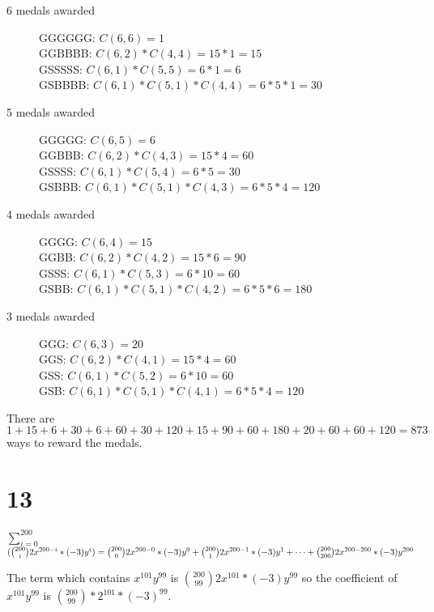 \documentclass[12pt]{article}
\begin{document}
\begin{description}
	\item[6 medals awarded]
	GGGGGG: $C(6, 6) = 1$\\
	GGBBBB: $C(6, 2) * C(4, 4) = 15 * 1 = 15$\\
	GSSSSS: $C(6, 1) * C(5, 5) = 6 * 1 = 6$\\
	GSBBBB: $C(6, 1) * C(5, 1) * C(4, 4) = 6 * 5 * 1 = 30$

	\item[5 medals awarded]
	GGGGG: $C(6, 5) = 6$\\
	GGBBB: $C(6, 2) * C(4, 3) = 15 * 4 = 60$\\
	GSSSS: $C(6, 1) * C(5, 4) = 6 * 5 = 30$\\
	GSBBB: $C(6, 1) * C(5, 1) * C(4, 3) = 6 * 5 * 4 = 120$

	\item[4 medals awarded]
	GGGG: $C(6, 4) = 15$\\
	GGBB: $C(6, 2) * C(4, 2) = 15 * 6 = 90$\\
	GSSS: $C(6, 1) * C(5, 3) = 6 * 10 = 60$\\
	GSBB: $C(6, 1) * C(5, 1) * C(4, 2) = 6 * 5 * 6 = 180$

	\item[3 medals awarded]
	GGG: $C(6, 3) = 20$\\
	GGS: $C(6, 2) * C(4, 1) = 15 * 4 = 60$\\
	GSS: $C(6, 1) * C(5, 2) = 6 * 10 = 60$\\
	GSB: $C(6, 1) * C(5, 1) * C(4, 1) = 6 * 5 * 4 = 120$
\end{description}

There are $1 + 15 + 6 + 30 + 6 + 60 + 30 + 120 + 15 + 90 + 60 + 180 + 20 + 60 + 60 + 120 = 873$ ways to reward the medals.

\section*{13}
$\sum_{i = 0}^{200}$$(\binom{200}{i} 2x^{200 - i} * (-3)y^i)\\
= \binom{200}{0} 2x^{200 - 0} * (-3)y^0 + \binom{200}{1} 2x^{200 - 1} * (-3)y^1 + \dots + \binom{200}{200} 2x^{200 - 200} * (-3)y^{200}$

The term which contains $x^{101}y^{99}$ is $\binom{200}{99} 2x^{101} * (-3)y^{99}$ so the coefficient of $x^{101}y^{99}$ is $\binom{200}{99} * 2^{101} * (-3)^{99}$.
\end{document}
